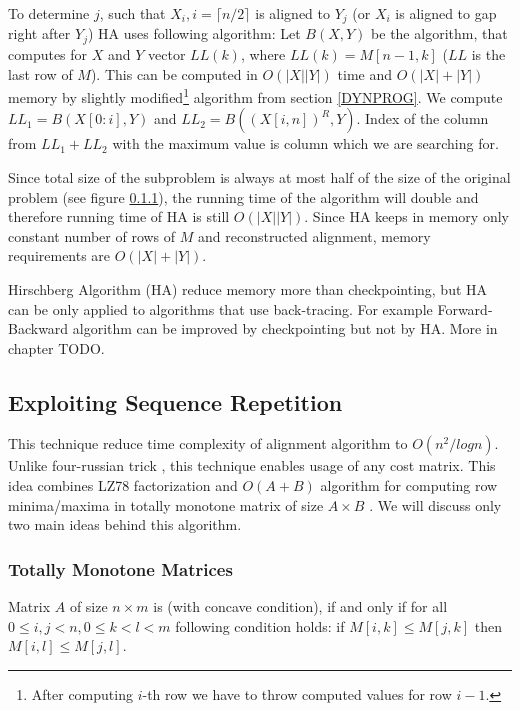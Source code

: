 To determine $j$, such that $X_i,i=\lceil n/2\rceil$ is aligned to $Y_j$ (or
$X_i$ is aligned to gap right after $Y_j$) HA uses following algorithm: Let
$B(X,Y)$ be the algorithm, that computes for $X$ and $Y$ vector $LL(k)$, where
$LL(k)=M[n-1,k]$ ($LL$ is the last row of $M$). This can be computed in
$O(|X||Y|)$ time and $O(|X|+|Y|)$ memory by slightly modified\footnote{After
computing $i$-th row we have to throw computed values for row $i-1$.} algorithm
from section \ref{DYNPROG}.  We compute $LL_1=B(X[0:i],Y)$ and $LL_2=B(
(X[i,n])^R,Y)$. Index of the column from $LL_1+LL_2$ with the maximum value is
column which we are searching for. 

Since total size of the subproblem is always at most half of the size of the
original problem (see figure \ref{}), the running time of the algorithm will
double and therefore running time of HA is still $O(|X||Y|)$. Since HA keeps in
memory only constant number of rows of $M$ and reconstructed alignment, memory
requirements are $O(|X|+|Y|)$.

Hirschberg Algorithm (HA) reduce memory more than checkpointing, but HA can be
only applied to algorithms that use back-tracing. For example Forward-Backward
algorithm can be improved by checkpointing but not by HA. More in chapter TODO.

\subsection{Exploiting Sequence Repetition}

This technique reduce time complexity of alignment algorithm to $O(n^2/log n)$.
Unlike four-russian trick \cite{}, this technique enables usage of any cost
matrix.  This idea combines LZ78 factorization \cite{} and $O(A+B)$ algorithm
for computing row minima/maxima in totally monotone matrix of size $A\times
B$ \cite{Aggarwal1987}. We will discuss only two main ideas behind this
algorithm.

\subsubsection{Totally Monotone Matrices}

\begin{definition}\cite{Crochemore2002}
Matrix $A$ of size $n\times m$ is  (with concave condition),
if and only if for all $0\leq i,j< n, 0\leq k<l<m$ following condition holds:
if $M[i,k]\leq M[j,k]$ then $M[i,l]\leq M[j,l]$.
\end{definition}

